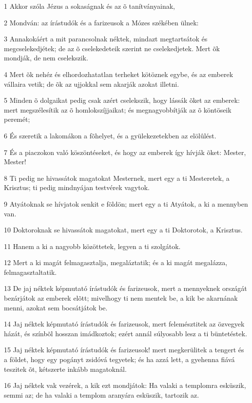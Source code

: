 \par 1 Akkor szóla Jézus a sokaságnak és az õ tanítványainak,
\par 2 Mondván: az írástudók és a farizeusok a Mózes székében ülnek:
\par 3 Annakokáért a mit parancsolnak néktek, mindazt megtartsátok és megcselekedjétek; de az õ cselekedeteik szerint ne cselekedjetek. Mert õk mondják, de nem cselekszik.
\par 4 Mert õk nehéz és elhordozhatatlan terheket kötöznek egybe, és az emberek vállaira vetik; de õk az ujjokkal sem akarják azokat illetni.
\par 5 Minden õ dolgaikat pedig csak azért cselekszik, hogy lássák õket az emberek: mert megszélesítik az õ homlokszíjjaikat; és megnagyobbítják az õ köntöseik peremét;
\par 6 És szeretik a lakomákon a fõhelyet, és a gyülekezetekben az elölûlést.
\par 7 És a piaczokon való köszöntéseket, és hogy az emberek így hívják õket: Mester, Mester!
\par 8 Ti pedig ne hivassátok magatokat Mesternek, mert egy a ti Mesteretek, a Krisztus; ti pedig mindnyájan testvérek vagytok.
\par 9 Atyátoknak se hívjatok senkit e földön; mert egy a ti Atyátok, a ki a mennyben van.
\par 10 Doktoroknak se hivassátok magatokat, mert egy a ti Doktorotok, a Krisztus.
\par 11 Hanem a ki a nagyobb közöttetek, legyen a ti szolgátok.
\par 12 Mert a ki magát felmagasztalja, megaláztatik; és a ki magát megalázza, felmagasztaltatik.
\par 13 De jaj néktek képmutató írástudók és farizeusok, mert a mennyeknek országát bezárjátok az emberek elõtt; mivelhogy ti nem mentek be, a kik be akarnának menni, azokat sem bocsátjátok be.
\par 14 Jaj néktek képmutató írástudók és farizeusok, mert felemésztitek az özvegyek házát, és színbõl hosszan imádkoztok; ezért annál súlyosabb lesz a ti büntetéstek.
\par 15 Jaj néktek képmutató írástudók és farizeusok! mert megkerülitek a tengert és a földet, hogy egy pogányt zsidóvá tegyetek; és ha azzá lett, a gyehenna fiává teszitek õt, kétszerte inkább magatoknál.
\par 16 Jaj néktek vak vezérek, a kik ezt mondjátok: Ha valaki a templomra esküszik, semmi az; de ha valaki a templom aranyára esküszik, tartozik az.
